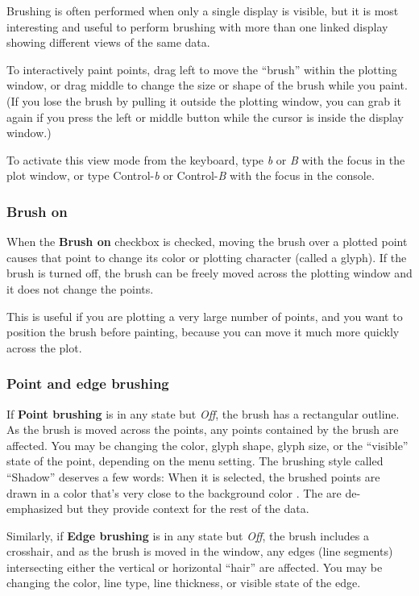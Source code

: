 \documentclass[11pt]{article}
\begin{document}
Brushing is often performed when only a single display is visible,
but it is most interesting and useful to perform brushing with more
than one linked display showing different views of the same data.  

To interactively paint points, drag left to move the ``brush'' within
the plotting window, or drag middle to change the size or shape of
the brush while you paint.  (If you lose the brush by pulling it
outside the plotting window, you can grab it again if you press the
left or middle button while the cursor is inside the display window.)

To activate this view mode from the keyboard, type {\em b} or {\em B}
with the focus in the plot window, or type Control-{\em b} or
Control-{\em B} with the focus in the console.

\subsubsection{Brush on}
%
When the {\bf Brush on} checkbox is checked, moving the brush
over a plotted point causes that point to change its color or
plotting character (called a glyph).  If the brush is turned off, the
brush can be freely moved across the plotting window and it does not
change the points.

This is useful if you are plotting a very large number of points,
and you want to position the brush before painting, because you
can move it much more quickly across the plot.  

\subsubsection{Point and edge brushing}
%
If {\bf Point brushing} is in any state but {\it Off}, the brush has a
rectangular outline.  As the brush is moved across the points, any
points contained by the brush are affected.  You may be changing the
color, glyph shape, glyph size, or the ``visible'' state of the point,
depending on the menu setting.  The brushing style called ``Shadow'' 
deserves a few words: When it is selected, the brushed points are drawn
in a color that's very close to the background color \cite{BeckerCleveland87}. 
The
are de-emphasized but they provide context for the rest of the data.

Similarly, if {\bf Edge brushing} is in any state but {\it Off}, the
brush includes a crosshair, and as the brush is moved in the window,
any edges (line segments) intersecting either the vertical or
horizontal ``hair'' are affected.  You may be changing the color,
line type, line thickness, or visible state of the edge.
\end{document}
